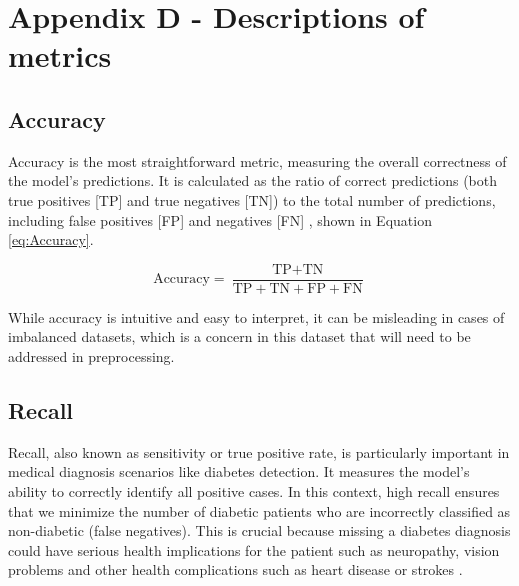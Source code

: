 \begingroup
\renewcommand\thechapter{C}
\titleformat{\chapter}[display]
{\normalfont\huge\bfseries}{}{20pt}{\Huge}
\setcounter{section}{0} %
\setcounter{figure}{0} %
\setcounter{equation}{0} %

\chapter*{Appendix D - Descriptions of metrics}

\section{Accuracy}
Accuracy is the most straightforward metric, measuring the overall correctness of the model's predictions. It is calculated as the ratio of correct predictions
(both true positives [TP] and true negatives [TN]) to the total number of predictions, including false positives [FP] and negatives [FN] \autocite{google_classification_nodate},
shown in Equation \ref{eq:Accuracy}.

\begin{equation}\label{eq:Accuracy}
    \text{Accuracy} = \frac{\text{TP} + \text{TN}}{\text{TP} + \text{TN} + \text{FP} + \text{FN}}
\end{equation}


\para While accuracy is intuitive and easy to interpret, it can be misleading in cases
of imbalanced datasets, which is a concern in this dataset that will need to be addressed in preprocessing.

\section{Recall}
Recall, also known as sensitivity or true positive rate, is particularly important in medical diagnosis scenarios like diabetes detection. It measures
the model's ability to correctly identify all positive cases. In this context, high recall ensures that we minimize the number of diabetic patients
who are incorrectly classified as non-diabetic (false negatives). This is crucial because missing a diabetes diagnosis could have serious health implications for the patient such 
as neuropathy, vision problems and other health complications such as heart disease or strokes \autocite{nhs_type_nodate}.

